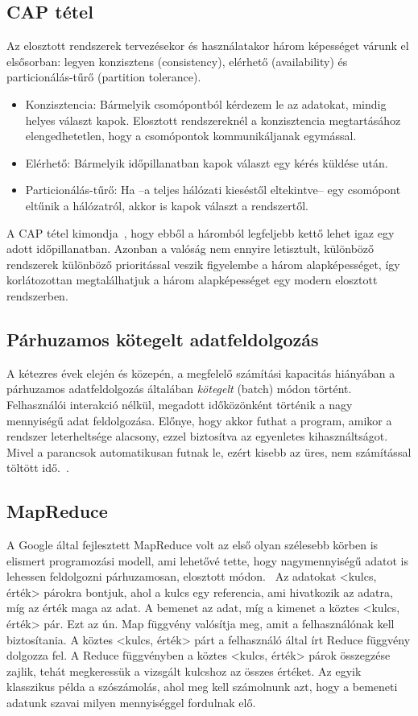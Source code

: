 \documentclass[a4paper,12pt]{article}
\begin{document}
\subsection{CAP tétel}
Az elosztott rendszerek tervezésekor és használatakor három képességet várunk el elsősorban: legyen konzisztens (consistency), elérhető (availability) és particionálás-tűrő (partition tolerance). 
\begin{itemize}
\item Konzisztencia: Bármelyik csomópontból kérdezem le az adatokat, mindig helyes választ kapok. Elosztott rendszereknél a konzisztencia megtartásához elengedhetetlen, hogy a csomópontok kommunikáljanak egymással. 
\item Elérhető: Bármelyik időpillanatban kapok választ egy kérés küldése után.
\item Particionálás-tűrő: Ha --a teljes hálózati kieséstől eltekintve-- egy csomópont eltűnik a hálózatról, akkor is kapok választ a rendszertől.
\end{itemize}
A CAP tétel kimondja~\cite{cap}, hogy ebből a háromból legfeljebb kettő lehet igaz egy adott időpillanatban. Azonban a valóság nem ennyire letisztult, különböző rendszerek különböző prioritással veszik figyelembe a három alapképességet, így korlátozottan megtalálhatjuk a három alapképességet egy modern elosztott rendszerben.~\parencite{ecap}

\subsection{Párhuzamos kötegelt adatfeldolgozás}
A kétezres évek elején és közepén, a megfelelő számítási kapacitás hiányában a párhuzamos adatfeldolgozás általában \textsl{kötegelt} (batch) módon történt. Felhasználói interakció nélkül, megadott időközönként történik a nagy mennyiségű adat feldolgozása. Előnye, hogy akkor futhat a program, amikor a rendszer leterheltsége alacsony, ezzel biztosítva az egyenletes kihasználtságot. Mivel a parancsok automatikusan futnak le, ezért kisebb az üres, nem számítással töltött idő.~\cite{batch}.

\subsection{MapReduce}
A Google által fejlesztett MapReduce volt az első olyan szélesebb körben is elismert programozási modell, ami lehetővé tette, hogy nagymennyiségű adatot is lehessen feldolgozni párhuzamosan, elosztott módon.~\cite{mapreduce} Az adatokat <kulcs, érték> párokra bontjuk, ahol a kulcs egy referencia, ami hivatkozik az adatra, míg az érték maga az adat. A bemenet az adat, míg a kimenet a köztes <kulcs, érték> pár. Ezt az ún. Map függvény valósítja meg, amit a felhasználónak kell biztosítania. A köztes <kulcs, érték> párt a felhasználó által írt Reduce függvény dolgozza fel. A Reduce függvényben a köztes <kulcs, érték> párok összegzése  zajlik, tehát megkeressük a vizsgált kulcshoz az összes értéket. \newline
Az egyik klasszikus példa a szószámolás, ahol meg kell számolnunk azt, hogy a bemeneti adatunk szavai milyen mennyiséggel fordulnak elő.
\end{document}
